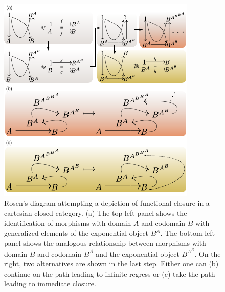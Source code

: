 \begin{figure}
\begin{center}
\noindent\includegraphics[width=0.75\columnwidth]{fig/mrcatclosure.pdf}
\end{center}
\caption{Rosen's diagram attempting a depiction of functional closure in a cartesian closed category. (a) The top-left panel shows the identification of morphisms with domain $A$ and codomain $B$ with generalized elements of the exponential object $B^A$. The bottom-left panel shows the analogous relationship between morphisms with domain $B$ and codomain $B^A$ and the exponential object $B^{A^B}$. On the right, two alternatives are shown in the last step. Either one can (b) continue on the path leading to infinite regress or (c) take the path leading to immediate closure.}
\label{fig:hom}
\end{figure}

